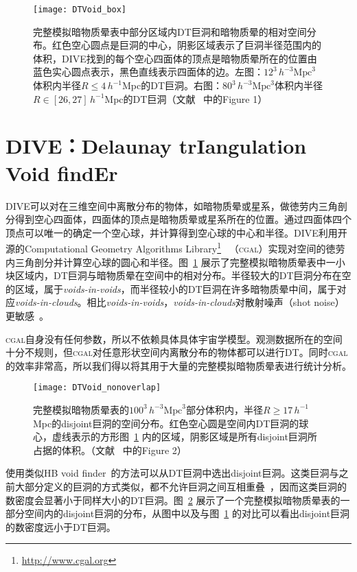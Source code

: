 \begin{figure}
\centering
\texttt{[image: DTVoid\_box]}
\caption{完整模拟暗物质晕表中部分区域内DT巨洞和暗物质晕的相对空间分布。红色空心圆点是巨洞的中心，阴影区域表示了巨洞半径范围内的体积，DIVE找到的每个空心四面体的顶点是暗物质晕所在的位置由蓝色实心圆点表示，黑色直线表示四面体的边。左图：$12^3\,h^{-3}\mathrm{Mpc}^3$体积内半径$R \leq 4\,h^{-1}$Mpc的DT巨洞。右图：$80^3\,h^{-3}\mathrm{Mpc}^3$体积内半径$R \in [26, 27]\,h^{-1}$Mpc的DT巨洞（文献 ~中的Figure 1）}
\label{fig:visual_all}
\end{figure}

\section{DIVE：Delaunay trIangulation Void findEr}
\label{sec:DIVE}

DIVE可以对在三维空间中离散分布的物体，如暗物质晕或星系，做徳劳内三角剖分得到空心四面体，四面体的顶点是暗物质晕或星系所在的位置。通过四面体四个顶点可以唯一的确定一个空心球，并计算得到空心球的中心和半径。DIVE利用开源的Computational Geometry Algorithms Library\footnote{\url{http://www.cgal.org}} ~\cite{Bronnimann2015, Jamin2015}（\textsc{cgal}）实现对空间的徳劳内三角剖分并计算空心球的圆心和半径。图~\ref{fig:visual_all} 展示了完整模拟暗物质晕表中一小块区域内，DT巨洞与暗物质晕在空间中的相对分布。半径较大的DT巨洞分布在空的区域，属于\textit{voids-in-voids}，而半径较小的DT巨洞在许多暗物质晕中间，属于对应\textit{voids-in-clouds}。相比\textit{voids-in-voids}，\textit{voids-in-clouds}对散射噪声（shot noise）更敏感~\cite{Cai2014}。

\textsc{cgal}自身没有任何参数，所以不依赖具体具体宇宙学模型。观测数据所在的空间十分不规则，但\textsc{cgal}对任意形状空间内离散分布的物体都可以进行DT。同时\textsc{cgal}的效率非常高，所以我们得以将其用于大量的完整模拟暗物质晕表进行统计分析。

\begin{figure}
\centering
\texttt{[image: DTVoid\_nonoverlap]}
\caption{完整模拟暗物质晕表的$100^3\,h^{-3}\mathrm{Mpc}^3$部分体积内，半径$R \geq 17\,h^{-1}$Mpc的disjoint巨洞的空间分布。红色空心圆是空间内DT巨洞的球心，虚线表示的方形图~\ref{fig:visual_all} 内的区域，阴影区域是所有disjoint巨洞所占据的体积。（文献 ~中的Figure 2）}
\label{fig:visual_dj}
\end{figure}

使用类似HB void finder~\cite{Patiri2006372}的方法可以从DT巨洞中选出disjoint巨洞。这类巨洞与之前大部分定义的巨洞的方式类似，都不允许巨洞之间互相重叠~\cite{Patiri2006HB,Micheletti02014}，因而这类巨洞的数密度会显著小于同样大小的DT巨洞。图~\ref{fig:visual_dj} 展示了一个完整模拟暗物质晕表的一部分空间内的disjoint巨洞的分布，从图中以及与图~\ref{fig:visual_all} 的对比可以看出disjoint巨洞的数密度远小于DT巨洞。

